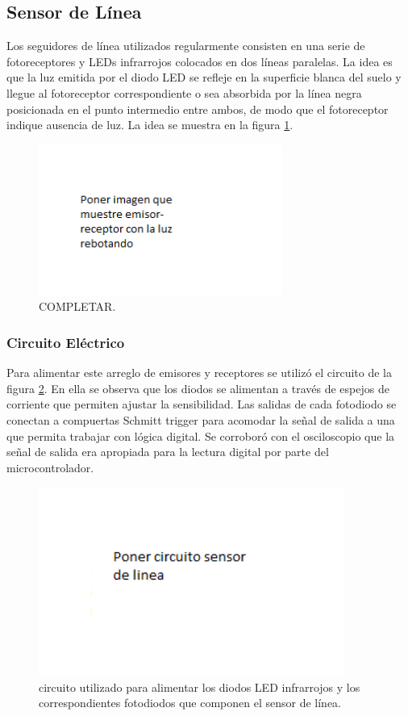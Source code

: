 \documentclass[10pt,conference,a4paper,onecolumn]{article}%
\begin{document}
\subsection{Sensor de Línea}
Los seguidores de línea utilizados regularmente consisten en una serie de fotoreceptores y LEDs infrarrojos colocados en dos líneas paralelas. La idea es que la luz emitida por el diodo LED se refleje en la superficie blanca del suelo y llegue al fotoreceptor correspondiente o sea absorbida por la línea negra posicionada en el punto intermedio entre ambos, de modo que el fotoreceptor indique ausencia de luz. La idea se muestra en la figura \ref{fig:sensorLinea}.
\begin{figure}[h]
\centering
\includegraphics[width=8cm]{./imagenes/sensorLinea.png}
\caption{COMPLETAR.}
\label{fig:sensorLinea}
\end{figure}

\subsubsection{Circuito Eléctrico}
Para alimentar este arreglo de emisores y receptores se utilizó el circuito de la figura \ref{fig:circuitoSensorLinea}. En ella se observa que los diodos se alimentan a través de espejos de corriente que permiten ajustar la sensibilidad. Las salidas de cada fotodiodo se conectan a compuertas Schmitt trigger para acomodar la señal de salida a una que permita trabajar con lógica digital. Se corroboró con el osciloscopio que la señal de salida era apropiada para la lectura digital por parte del microcontrolador.
\begin{figure}[h]
	\centering
	\includegraphics[width=10cm]{./imagenes/circuitoSensorLinea}
	\caption{circuito utilizado para alimentar los diodos LED infrarrojos y los correspondientes fotodiodos que componen el sensor de línea.}
	\label{fig:circuitoSensorLinea}
\end{figure}
\end{document}
